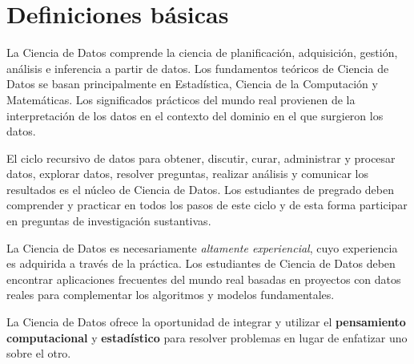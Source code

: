 \section{Definiciones básicas}\label{sec:ds-definiciones-basicas}

La Ciencia de Datos comprende la ciencia de planificación, adquisición, gestión, análisis e inferencia a partir de datos. Los fundamentos teóricos de Ciencia de Datos se basan principalmente en Estadí­stica, Ciencia de la Computación y Matemáticas. Los significados prácticos del mundo real provienen de la interpretación de los datos en el contexto del dominio en el que surgieron los datos.

El ciclo recursivo de datos para obtener, discutir, curar, administrar y procesar datos, explorar datos, resolver preguntas, realizar análisis y comunicar los resultados es el núcleo de Ciencia de Datos. Los estudiantes de pregrado deben comprender y practicar en todos los pasos de este ciclo y de esta forma participar en preguntas de investigación sustantivas.

La Ciencia de Datos es necesariamente \emph{altamente experiencial}, cuyo experiencia es adquirida a través de la práctica. Los estudiantes de Ciencia de Datos deben encontrar aplicaciones frecuentes del mundo real basadas en proyectos con datos reales para complementar los algoritmos y modelos fundamentales.

La Ciencia de Datos ofrece la oportunidad de integrar y utilizar el \textbf{pensamiento computacional} y \textbf{estadí­stico} para resolver problemas en lugar de enfatizar uno sobre el otro.